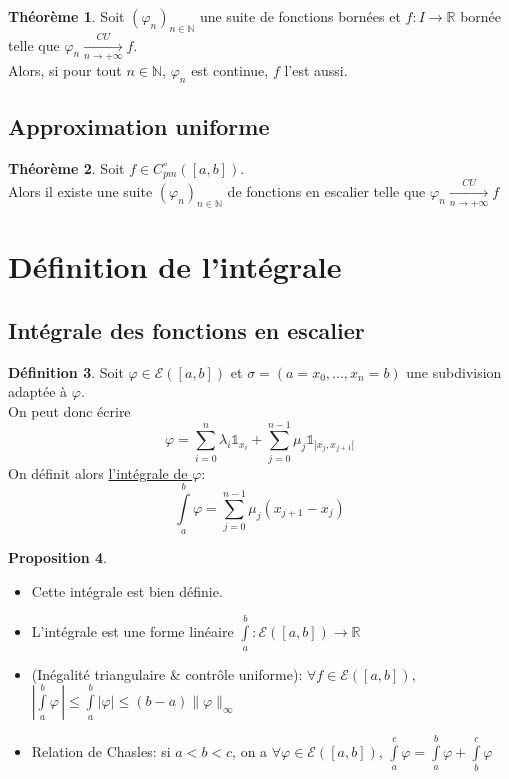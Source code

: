 \documentclass[10pt,a4paper]{article}
\theoremstyle{definition}
\newtheorem{proposition}{Proposition}[section]
\newtheorem{theorem}[proposition]{Théorème}
\newtheorem{definition}[proposition]{Définition}
\begin{document}
\begin{theorem}
Soit $(\varphi_n)_{n \in \mathbb{N}}$ une suite de fonctions bornées et $f: I \to \mathbb{R}$ bornée telle que $\varphi_n \xrightarrow[n \to +\infty]{CU} f$. \\
Alors, si pour tout $n \in \mathbb{N}$, $\varphi_n$ est continue, $f$ l'est aussi. 
\end{theorem}

\subsection{Approximation uniforme}
\begin{theorem}
Soit $f \in C^{\circ}_{pm}([a, b])$. \\
Alors il existe une suite $(\varphi_n)_{n \in \mathbb{N}}$ de fonctions en escalier telle que $\varphi_n \xrightarrow[n \to +\infty]{CU} f$
\end{theorem}

\section{Définition de l'intégrale}
\subsection{Intégrale des fonctions en escalier}
\begin{definition}
Soit $\varphi \in \mathcal{E}([a, b])$ et $\sigma = (a = x_0, ... , x_n = b)$ une subdivision adaptée à $\varphi$. \\
On peut donc écrire 
\[\varphi = \sum\limits_{i=0}^{n} \lambda_i \mathds{1}_{x_i} + \sum\limits_{j=0}^{n-1} \mu_j \mathds{1}_{]x_j, x_{j+1}[}\]
On définit alors \uline{l'intégrale de $\varphi$}: 
\[\int\limits_a^b \varphi = \sum\limits_{j=0}^{n-1} \mu_j (x_{j+1} - x_j)\]
\end{definition}
\begin{proposition}
\hfill
\begin{itemize}
\item Cette intégrale est bien définie.
\item L'intégrale est une forme linéaire $\int\limits_a^b : \mathcal{E}([a, b]) \to \mathbb{R}$
\item (Inégalité triangulaire \textnormal{\&} contrôle uniforme): $ \forall f \in \mathcal{E}([a, b])$, $|\int\limits_a^b \varphi \,| \leq \int\limits_a^b |\varphi| \leq (b - a)\lVert \varphi \rVert_\infty$
\item Relation de Chasles: si $a < b < c$, on a $\forall \varphi \in \mathcal{E}([a, b])$, $\int\limits_a^c \varphi = \int\limits_a^b \varphi + \int\limits_b^c \varphi$
\end{itemize}
\end{proposition}
\end{document}

